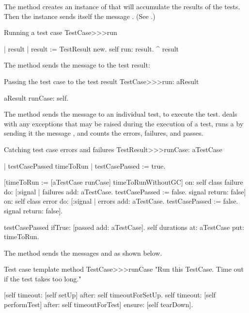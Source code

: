 \documentclass[a4paper,10pt,twoside]{book}
\begin{document}
The method  creates an instance of  that will accumulate the results of the tests.
Then the  instance sends itself the message .
(See .)

\begin{method}[tastecaserun]{Running a test case}
TestCase>>>run

	| result |
	result := TestResult new.
	self run: result.
	^ result
\end{method}

The method  sends the message  to the test result:

\begin{method}[testcaserun:]{Passing the test case to the test result}
TestCase>>>run: aResult

	aResult runCase: self.
\end{method}

The method  sends the message  to an individual test, to execute the test.
 deals with any exceptions that may be raised during the execution of a test, runs a  by sending it the message , and counts the errors, failures, and passes.

\begin{method}[testresultruncase]{Catching test case errors and failures}
TestResult>>>runCase: aTestCase

	| testCasePassed timeToRun |
	testCasePassed := true.

	[timeToRun := [aTestCase runCase] timeToRunWithoutGC] 
		on: self class failure
		do: [:signal | 
				failures add: aTestCase.
				testCasePassed := false.
				signal return: false]
		on: self class error
		do: [:signal |
				errors add: aTestCase.
				testCasePassed := false.
				signal return: false].
			
	testCasePassed ifTrue: [passed add: aTestCase].
	self durations at: aTestCase put: timeToRun.
\end{method}

The method  sends the messages  and  as shown below.
\begin{method}[testcaseruncase]{Test case template method}
TestCase>>>runCase
	"Run this TestCase. Time out if the test takes too long."

	[self timeout: [self setUp] after: self timeoutForSetUp.
	self timeout: [self performTest] after: self timeoutForTest]
			ensure: [self tearDown].
\end{method}
\end{document}
